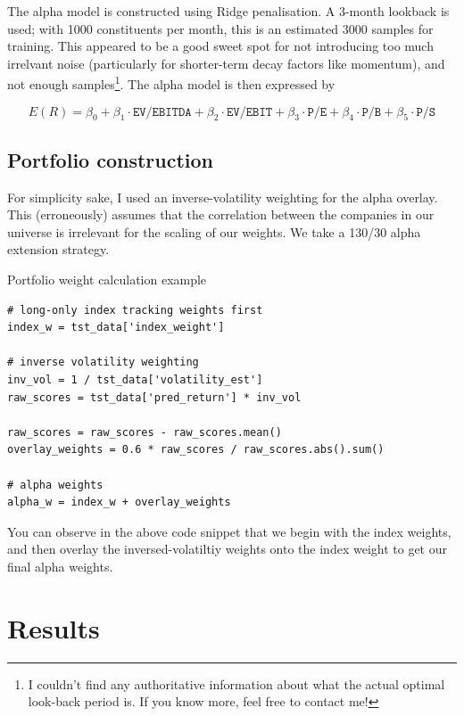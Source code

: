 \documentclass[12pt]{article}
\begin{document}
The alpha model is constructed using Ridge penalisation. A 3-month lookback is used; with 1000 constituents 
per month, this is an estimated 3000 samples for training. This appeared to be a good sweet spot for 
not introducing too much irrelvant noise (particularly for shorter-term decay factors like momentum), and 
not enough samples\footnote{I couldn't find any authoritative information about what the actual 
optimal look-back period is. If you know more, feel free to contact me!}. The alpha model is then expressed 
by

$$ E(R) = \beta_0 + \beta_1 \cdot \texttt{EV/EBITDA} + \beta_2 \cdot \texttt{EV/EBIT} + \beta_3 \cdot \texttt{P/E} + \beta_4 \cdot \texttt{P/B} + \beta_5 \cdot \texttt{P/S}
$$

\subsection{Portfolio construction}

For simplicity sake, I used an inverse-volatility weighting for the alpha overlay. This (erroneously)
assumes that the correlation between the companies in our universe is irrelevant for the scaling of 
our weights. We take a 130/30 alpha extension strategy.
\begin{example}{Portfolio weight calculation example}
\begin{verbatim}
# long-only index tracking weights first
index_w = tst_data['index_weight']

# inverse volatility weighting
inv_vol = 1 / tst_data['volatility_est']
raw_scores = tst_data['pred_return'] * inv_vol

raw_scores = raw_scores - raw_scores.mean()
overlay_weights = 0.6 * raw_scores / raw_scores.abs().sum()

# alpha weights
alpha_w = index_w + overlay_weights
\end{verbatim}
\end{example}
You can observe in the above code snippet that we begin with the index weights, and then overlay the 
inversed-volatiltiy weights onto the index weight to get our final alpha weights.

\section{Results}
\end{document}
